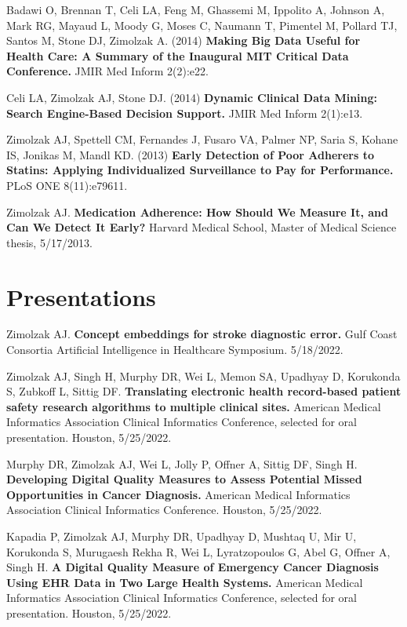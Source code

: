\documentclass[10pt]{article}
\begin{document}
Badawi O, Brennan T, Celi LA, Feng M, Ghassemi M, Ippolito A, Johnson
A, Mark RG, Mayaud L, Moody G, Moses C, Naumann T, Pimentel M, Pollard
TJ, Santos M, Stone DJ, Zimolzak A. (2014) \textbf{Making Big Data
  Useful for Health Care: A Summary of the Inaugural MIT Critical Data
  Conference.} JMIR Med Inform 2(2):e22.

Celi LA, Zimolzak AJ, Stone DJ. (2014) \textbf{Dynamic Clinical Data
  Mining: Search Engine-Based Decision Support.} JMIR Med Inform
2(1):e13.

Zimolzak AJ, Spettell CM, Fernandes J, Fusaro VA, Palmer NP, Saria S,
Kohane IS, Jonikas M, Mandl KD. (2013) \textbf{Early Detection of Poor
  Adherers to Statins: Applying Individualized Surveillance to Pay for
  Performance.} PLoS ONE 8(11):e79611.

Zimolzak AJ. \textbf{Medication Adherence: How Should We Measure It,
  and Can We Detect It Early?} Harvard Medical School, Master of
Medical Science thesis, 5/17/2013.




\section*{Presentations} %

Zimolzak AJ. \textbf{Concept embeddings for stroke diagnostic error.}
Gulf Coast Consortia Artificial Intelligence in Healthcare Symposium.
5/18/2022.


Zimolzak AJ, Singh H, Murphy DR, Wei L, Memon SA, Upadhyay D,
Korukonda S, Zubkoff L, Sittig DF. \textbf{Translating electronic
  health record-based patient safety research algorithms to multiple
  clinical sites.} American Medical Informatics Association Clinical
Informatics Conference, selected for oral presentation. Houston,
5/25/2022.

Murphy DR, Zimolzak AJ, Wei L, Jolly P, Offner A, Sittig DF, Singh H.
\textbf{Developing Digital Quality Measures to Assess Potential Missed
  Opportunities in Cancer Diagnosis.} American Medical Informatics
Association Clinical Informatics Conference. Houston, 5/25/2022.

Kapadia P, Zimolzak AJ, Murphy DR, Upadhyay D, Mushtaq U, Mir U,
Korukonda S, Murugaesh Rekha R, Wei L, Lyratzopoulos G, Abel G, Offner
A, Singh H. \textbf{A Digital Quality Measure of Emergency Cancer
  Diagnosis Using EHR Data in Two Large Health Systems.} American
Medical Informatics Association Clinical Informatics Conference,
selected for oral presentation. Houston, 5/25/2022.
\end{document}

